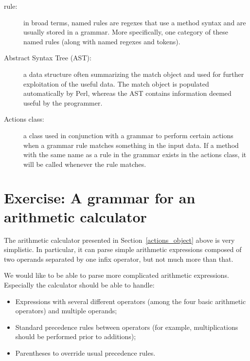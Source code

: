 \begin{description}
\item[rule:] in broad terms, named rules are regexes that use a 
method syntax and are usually stored in a grammar. More specifically, 
one category of these named rules (along with named regexes and 
tokens).

\item[Abstract Syntax Tree (AST):] a data structure often 
summarizing the match object and used for further exploitation 
of the useful data. The match object is populated automatically 
by Perl, whereas the AST contains information deemed useful by 
the programmer.

\item[Actions class:] a class used in conjunction with a grammar 
to perform certain actions when a grammar rule matches 
something in the input data. If a method with the same name 
as a rule in the grammar exists in the actions class, it will 
be called whenever the rule matches.

\end{description}

\section{Exercise: A grammar for an arithmetic calculator}
\label{calculator}

The arithmetic calculator presented in Section~\ref{actions_object} 
above is very simplistic. In particular, it can parse simple 
arithmetic expressions composed of two operands separated by 
one infix operator, but not much more than that.

We would like to be able to parse more complicated arithmetic 
expressions. Especially the calculator should be able to handle:
\begin{itemize}
\item Expressions with several different operators (among the four 
basic arithmetic operators) and multiple operands;
\item Standard precedence rules between operators (for example,
multiplications should be performed prior to additions);
\item Parentheses to override usual precedence rules.
\end{itemize}

